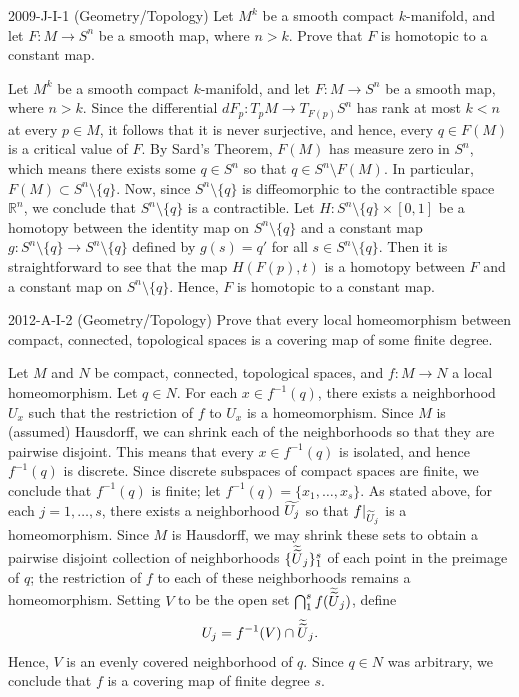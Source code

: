 \documentclass{article}
\begin{document}
\begin{prb}{2009-J-I-1 (Geometry/Topology)}
	Let $M^{k}$ be a smooth compact $k$-manifold, and let $F: M \to S^{n}$ be a smooth map, where $n > k$. Prove that $F$ is homotopic to a constant map. 
\end{prb}
\begin{solutions}
	Let $M^{k}$ be a smooth compact $k$-manifold, and let $F: M \to S^{n}$ be a smooth map, where $n > k$. Since the differential $dF_{p}: T_{p}M \to T_{F(p)}S^{n}$ has rank at most $k < n$ at every $p \in M$, it follows that it is never surjective, and hence, every $q \in F(M)$ is a critical value of $F$. By Sard's Theorem, $F(M)$ has measure zero in $S^{n}$, which means there exists some $q \in S^{n}$ so that $q \in S^{n}\setminus F(M)$. In particular, $F(M) \subset S^{n}\setminus \{q\}$. Now, since $S^{n} \setminus \{q\}$ is diffeomorphic to the contractible space $\mathbb{R}^{n}$, we conclude that $S^{n}\setminus \{q\}$ is a contractible. Let $H: S^{n} \setminus \{q\} \times [0,1]$ be a homotopy between the identity map on $S^{n} \setminus \{q\}$ and a constant map $g: S^{n}\setminus \{q\} \to S^{n} \setminus \{q\}$ defined by $g(s) = q'$ for all $s \in S^{n}\setminus \{q\}$. Then it is straightforward to see that the map $H(F(p),t)$ is a homotopy between $F$ and a constant map on $S^{n}\setminus \{q\}$. Hence, $F$ is homotopic to a constant map. 
\end{solutions}
\begin{prb}{2012-A-I-2 (Geometry/Topology)}
	Prove that every local homeomorphism between compact, connected, topological spaces is a covering map of some finite degree. 
\end{prb}
\begin{solutions}
	Let $M$ and $N$ be compact, connected, topological spaces, and $f: M \to N$ a local homeomorphism. Let $q \in N$. For each $x \in f^{-1}(q)$, there exists a neighborhood $U_{x}$ such that the restriction of $f$ to $U_{x}$ is a homeomorphism. Since $M$ is (assumed) Hausdorff, we can shrink each of the neighborhoods so that they are pairwise disjoint. This means that every $x \in f^{-1}(q)$ is isolated, and hence $f^{-1}(q)$ is discrete. Since discrete subspaces of compact spaces are finite, we conclude that $f^{-1}(q)$ is finite; let $f^{-1}(q) = \{x_{1}, \ldots, x_{s}\}$. As stated above, for each $j = 1, \ldots, s$, there exists a neighborhood $\widetilde{U_{j}}$ so that $f|_{\widetilde{U}_{j}}$ is a homeomorphism. Since $M$ is Hausdorff, we may shrink these sets to obtain a pairwise disjoint collection of neighborhoods $\{\widetilde{\widetilde{U}}_{j}\}_{1}^{s}$ of each point in the preimage of $q$; the restriction of $f$ to each of these neighborhoods remains a homeomorphism. Setting $V$ to be the open set $\bigcap_{1}^{s}f(\widetilde{\widetilde{U}}_{j})$, define 
		\begin{equation}
			U_{j} = f^{-1}(V) \cap \widetilde{\widetilde{U}}_{j}. 
		\end{equation}
	Hence, $V$ is an evenly covered neighborhood of $q$. Since $q \in N$ was arbitrary, we conclude that $f$ is a covering map of finite degree $s$. 
\end{solutions}
\end{document}
